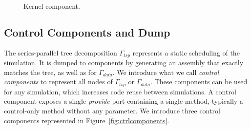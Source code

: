 \begin{figure}
\begin{center}
\end{center}
\caption{Kernel component.}
\label{fig:k}
\end{figure}
  
\subsection{Control Components and Dump}
The series-parallel tree decomposition $\Gamma_{tsp}$ represents a static scheduling of the simulation.
It is dumped to components by generating an assembly that exactly matches the tree, as well as for $\Gamma_{data}$.
We introduce what we call \emph{control components} to represent all nodes of $\Gamma_{tsp}$ or $\Gamma_{data}$.
These components can be used for any simulation, which increases code reuse between simulations.
A control component exposes a single \emph{provide} port containing a single method, typically a control-only method without any parameter.
We introduce three control components represented in Figure~\ref{fig:ctrlcomponents}.

